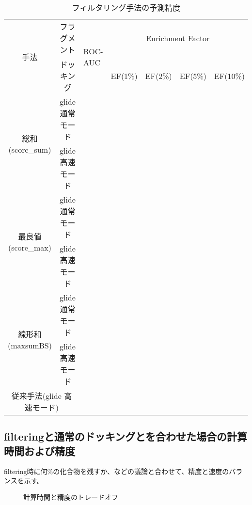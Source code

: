 \begin{table}[htb] \centering
	\caption{フィルタリング手法の予測精度}
	\label{tb:filtering_accuracy}
	\begin{tabular}{c|c|lllll|}
	\multirow{2}{*}{手法}				&フラグメント		&\multirow{2}{*}{ROC-AUC}	&\multicolumn{4}{c}{Enrichment Factor}	\\
									&ドッキング		&						&EF(1\%)	&EF(2\%)	&EF(5\%)	&EF(10\%)	\\ \hline
	\multirow{2}{*}{総和(score\_sum)}		&glide 通常モード	&						&		&		&		&			\\
									&glide 高速モード	&						&		&		&		&			\\
	\multirow{2}{*}{最良値(score\_max)}	&glide 通常モード	&						&		&		&		&			\\
									&glide 高速モード	&						&		&		&		&			\\
	\multirow{2}{*}{線形和(maxsumBS)}	&glide 通常モード	&						&		&		&		&			\\
									&glide 高速モード	&						&		&		&		&			\\ \hline
	\multicolumn{2}{c|}{従来手法(glide 高速モード)}			&						&		&		&		&			\\ \hline
	\end{tabular}
\end{table}

\subsection{filteringと通常のドッキングとを合わせた場合の計算時間および精度}
filtering時に何\%の化合物を残すか、などの議論と合わせて、精度と速度のバランスを示す。

\begin{figure}[htp]
 \begin{center}
  \caption{計算時間と精度のトレードオフ}
  \label{fig:trade_off}
 \end{center}
\end{figure}
